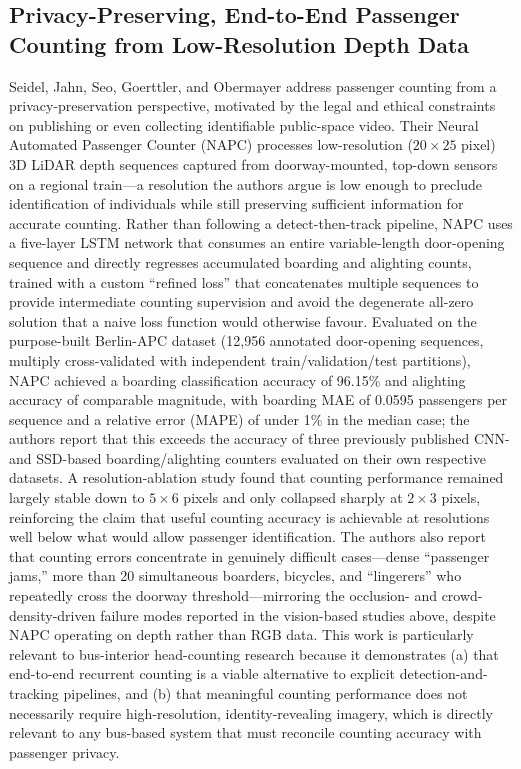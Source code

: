 \documentclass[12pt,a4paper]{report}
\begin{document}
\subsection{Privacy-Preserving, End-to-End Passenger Counting from Low-Resolution Depth Data}

Seidel, Jahn, Seo, Goerttler, and Obermayer address passenger counting from a privacy-preservation perspective, motivated by the legal and ethical constraints on publishing or even collecting identifiable public-space video. Their Neural Automated Passenger Counter (NAPC) processes low-resolution ($20\times25$ pixel) 3D LiDAR depth sequences captured from doorway-mounted, top-down sensors on a regional train---a resolution the authors argue is low enough to preclude identification of individuals while still preserving sufficient information for accurate counting. Rather than following a detect-then-track pipeline, NAPC uses a five-layer LSTM network that consumes an entire variable-length door-opening sequence and directly regresses accumulated boarding and alighting counts, trained with a custom ``refined loss'' that concatenates multiple sequences to provide intermediate counting supervision and avoid the degenerate all-zero solution that a naive loss function would otherwise favour. Evaluated on the purpose-built Berlin-APC dataset (12,956 annotated door-opening sequences, multiply cross-validated with independent train/validation/test partitions), NAPC achieved a boarding classification accuracy of 96.15\% and alighting accuracy of comparable magnitude, with boarding MAE of 0.0595 passengers per sequence and a relative error (MAPE) of under 1\% in the median case; the authors report that this exceeds the accuracy of three previously published CNN- and SSD-based boarding/alighting counters evaluated on their own respective datasets. A resolution-ablation study found that counting performance remained largely stable down to $5\times6$ pixels and only collapsed sharply at $2\times3$ pixels, reinforcing the claim that useful counting accuracy is achievable at resolutions well below what would allow passenger identification. The authors also report that counting errors concentrate in genuinely difficult cases---dense ``passenger jams,'' more than 20 simultaneous boarders, bicycles, and ``lingerers'' who repeatedly cross the doorway threshold---mirroring the occlusion- and crowd-density-driven failure modes reported in the vision-based studies above, despite NAPC operating on depth rather than RGB data. This work is particularly relevant to bus-interior head-counting research because it demonstrates (a) that end-to-end recurrent counting is a viable alternative to explicit detection-and-tracking pipelines, and (b) that meaningful counting performance does not necessarily require high-resolution, identity-revealing imagery, which is directly relevant to any bus-based system that must reconcile counting accuracy with passenger privacy.
\end{document}
